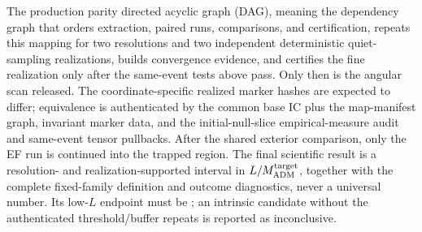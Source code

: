 The production parity directed acyclic graph (DAG), meaning the dependency
graph that orders extraction, paired runs, comparisons, and certification,
repeats this mapping for two resolutions and two
independent deterministic quiet-sampling realizations, builds convergence
evidence, and certifies the fine realization only after the same-event tests
above pass.  Only then is the angular scan released.  The coordinate-specific
realized marker hashes are expected to differ; equivalence is authenticated by
the common base IC plus the map-manifest graph, invariant marker data, and the
initial-null-slice empirical-measure audit and same-event tensor pullbacks.
After the shared exterior
comparison, only the EF run is continued into the trapped region.  The final
scientific result is a resolution- and realization-supported interval in
\(L/M_{\rm ADM}^{\rm target}\), together with the complete fixed-family
definition and outcome diagnostics, never a universal number.  Its low-\(L\)
endpoint must be ; an intrinsic candidate without
the authenticated threshold/buffer repeats is reported as inconclusive.
